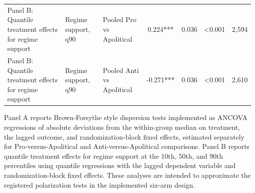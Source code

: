 \begin{table}[H]
\begin{threeparttable}
\begin{tabular}{lllcccc}
Panel B: Quantile treatment effects for regime support & Regime support, q90 & Pooled Pro vs Apolitical & 0.224*** & 0.036 & <0.001 & 2,594 \\
Panel B: Quantile treatment effects for regime support & Regime support, q90 & Pooled Anti vs Apolitical & -0.271*** & 0.036 & <0.001 & 2,610 \\
\bottomrule
\end{tabular}
\begin{tablenotes}[flushleft]
\footnotesize
\item Panel A reports Brown-Forsythe style dispersion tests implemented as ANCOVA regressions of absolute deviations from the within-group median on treatment, the lagged outcome, and randomization-block fixed effects, estimated separately for Pro-versus-Apolitical and Anti-versus-Apolitical comparisons. Panel B reports quantile treatment effects for regime support at the 10th, 50th, and 90th percentiles using quantile regressions with the lagged dependent variable and randomization-block fixed effects. These analyses are intended to approximate the registered polarization tests in the implemented six-arm design.
\end{tablenotes}
\end{threeparttable}
\end{table}
